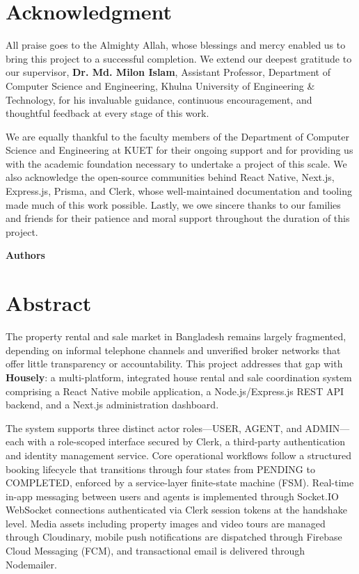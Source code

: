 \documentclass[12pt,a4paper]{report}
\begin{document}
\chapter*{Acknowledgment}
\thispagestyle{plain}

All praise goes to the Almighty Allah, whose blessings and mercy enabled us to bring this
project to a successful completion. We extend our deepest gratitude to our supervisor,
\textbf{Dr. Md. Milon Islam}, Assistant Professor, Department of Computer Science and
Engineering, Khulna University of Engineering \& Technology, for his invaluable guidance,
continuous encouragement, and thoughtful feedback at every stage of this work.

We are equally thankful to the faculty members of the Department of Computer Science
and Engineering at KUET for their ongoing support and for providing us with the
academic foundation necessary to undertake a project of this scale. We also acknowledge
the open-source communities behind React Native, Next.js, Express.js, Prisma, and
Clerk, whose well-maintained documentation and tooling made much of this work
possible. Lastly, we owe sincere thanks to our families and friends for their patience and
moral support throughout the duration of this project.

\vspace{24pt}
\hfill{\fontsize{12}{18}\bfseries Authors}

\clearpage

\chapter*{Abstract}
\thispagestyle{plain}

The property rental and sale market in Bangladesh remains largely fragmented, depending
on informal telephone channels and unverified broker networks that offer little transparency
or accountability. This project addresses that gap with \textbf{Housely}: a multi-platform,
integrated house rental and sale coordination system comprising a React Native mobile
application, a Node.js/Express.js REST API backend, and a Next.js administration
dashboard.

The system supports three distinct actor roles---USER, AGENT, and ADMIN---each with a
role-scoped interface secured by Clerk, a third-party authentication and identity
management service. Core operational workflows follow a structured booking lifecycle that
transitions through four states from PENDING to COMPLETED, enforced by a service-layer
finite-state machine (FSM). Real-time in-app messaging between users and agents is
implemented through Socket.IO WebSocket connections authenticated via Clerk session
tokens at the handshake level. Media assets including property images and video tours are
managed through Cloudinary, mobile push notifications are dispatched through Firebase
Cloud Messaging (FCM), and transactional email is delivered through Nodemailer.
\end{document}
